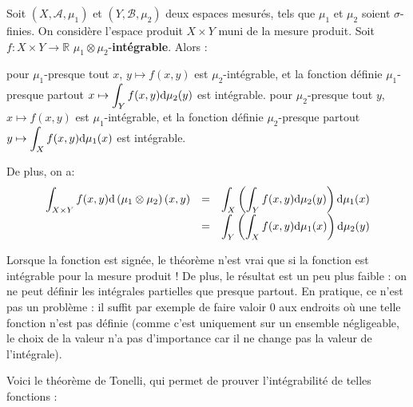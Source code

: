 \documentclass[../integ-proba.tex]{subfiles}
\begin{document}
\begin{thm}
  \label{thm:fubini}
  Soit $\left(X, \mathcal{A}, \mu_1\right)$ et $\left(Y, \mathcal{B}, \mu_2\right)$ deux espaces mesurés, tels que $\mu_1$ et $\mu_2$ soient $\sigma$-finies.
  On considère l'espace produit $X \times Y$ muni de la mesure produit.
  Soit $f:X \times Y \rightarrow \mathbb{R}$ $\mu_1 \otimes \mu_2$-\textbf{intégrable}.
  Alors :
  \begin{itemize}
    \itemb pour $\mu_1$-presque tout $x$, $y \mapsto f(x,y)$ est $\mu_2$-intégrable, et la fonction définie $\mu_1$-presque partout $\displaystyle x \mapsto \int_Y f(x,y) \textnormal{d}\mu_2(y)$ est intégrable.
    \itemb pour $\mu_2$-presque tout $y$, $x \mapsto f(x,y)$ est $\mu_1$-intégrable, et la fonction définie $\mu_2$-presque partout $\displaystyle y \mapsto \int_X f(x,y) \textnormal{d}\mu_1(x)$ est intégrable.
  \end{itemize}

  De plus, on a:
  $$
  {
  \everymath={\displaystyle}
  \begin{array}{rcl}
    \int_{X \times Y} f(x,y) \textnormal{d} \left(\mu_1 \otimes \mu_2 \right) (x,y) & = & \int_X \left( \int_Y f(x,y) \textnormal{d} \mu_2(y) \right) \textnormal{d} \mu_1(x)\\
                                                                                    & = & \int_Y \left( \int_X f(x,y) \textnormal{d} \mu_1(x) \right) \textnormal{d} \mu_2(y)\\
  \end{array}
  }
  $$
\end{thm}

\begin{rem}
  Lorsque la fonction est signée, le théorème n'est vrai que si la fonction est intégrable pour la mesure produit !
  De plus, le résultat est un peu plus faible : on ne peut définir les intégrales partielles que presque partout.
  En pratique, ce n'est pas un problème : il suffit par exemple de faire valoir $0$ aux endroits où une telle fonction n'est pas définie (comme c'est uniquement sur un ensemble négligeable, le choix de la valeur n'a pas d'importance car il ne change pas la valeur de l'intégrale).
\end{rem}

Voici le théorème de Tonelli, qui permet de prouver l'intégrabilité de telles fonctions :
\end{document}
